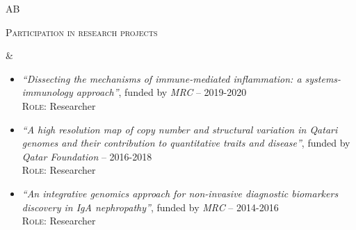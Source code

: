 \documentclass[a4paper,10pt]{article}
\newenvironment{doubletablelist}
{
	\vspace{-0.2cm}
	\begin{longtable}[!h]{AB}}{\end{longtable}
}
\newcommand{\dtlist}[2]{
\hspace{-3cm}
\noindent
	\begin{minipage}{0.24\textwidth}
	\begin{flushright}
	\textsc{#1}
	\end{flushright}
	\end{minipage}
	& #2\\[0.2cm]
}
\newcommand{\minusitem}{\item[-]}
\begin{document}
\begin{doubletablelist}
\dtlist{Participation in research projects}{
	\vspace{-0.8cm}
	\begin{itemize} %
		\minusitem  \begin{minipage}{0.65\textwidth}
			\emph{``Dissecting the mechanisms of immune-mediated inflammation: a systems-immunology approach''}, funded by \emph{MRC} -- 2019-2020\\
			\textsc{Role:} Researcher
		\end{minipage}
		\minusitem  \begin{minipage}{0.65\textwidth}
			\emph{``A high resolution map of copy number and structural variation in Qatari genomes and their contribution to quantitative traits and disease''}, funded by \emph{Qatar Foundation} -- 2016-2018\\
			\textsc{Role:} Researcher
		\end{minipage}
		\minusitem  \begin{minipage}{0.65\textwidth}
			\emph{``An integrative genomics approach for non-invasive diagnostic biomarkers discovery in IgA nephropathy''}, funded by \emph{MRC} -- 2014-2016\\
			\textsc{Role:} Researcher
		\end{minipage}
		
		
	\end{itemize}
}
\end{doubletablelist}
	
\end{document}

